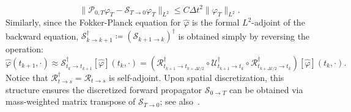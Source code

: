 \documentclass[10pt,a4paper]{article}
\begin{document}
\begin{equation}
\|\mathcal{P}_{0,T} \varphi_T - \mathcal{S}_{T\to 0} \varphi_T\|_{L^2} \leqslant C \Delta t^2 \|\varphi_T\|_{L^2}.
\end{equation}%
Similarly, since the Fokker-Planck equation for $\hat{\varphi}$ is the formal $L^2$-adjoint of the backward equation, $\mathcal{S}_{k\to k+1}^\dagger \coloneq (\mathcal{S}_{k+1\to k})^\dagger$ is obtained simply by reversing the operation:
\begin{equation}
\hat{\varphi}(t_{k+1}, \cdot) \approx \mathcal{S}_{t_k\to t_{k+1}}^\dagger[\hat{\varphi}](t_k, \cdot) = \left(\mathcal{R}_{t_{k+1}\to t_{k+\Delta t/2}}^\dagger \circ \mathcal{U}_{t_{k+1}\to t_k}^\dagger \circ \mathcal{R}_{t_{k+\Delta t/2}\to t_k}^\dagger\right)[\hat{\varphi}](t_k, \cdot).
\end{equation}%
Notice that $\mathcal{R}_{t\to s}^\dagger = \mathcal{R}_{t\to s}$ is self-adjoint. Upon spatial discretization, this structure ensures the discretized forward propagator $\mathcal{S}_{0\to T}$ can be obtained via mass-weighted matrix transpose of $\mathcal{S}_{T\to 0}$; see also~\cite{eldesoukey2026schrodingerbridgeskineticswarming}.
\end{document}
